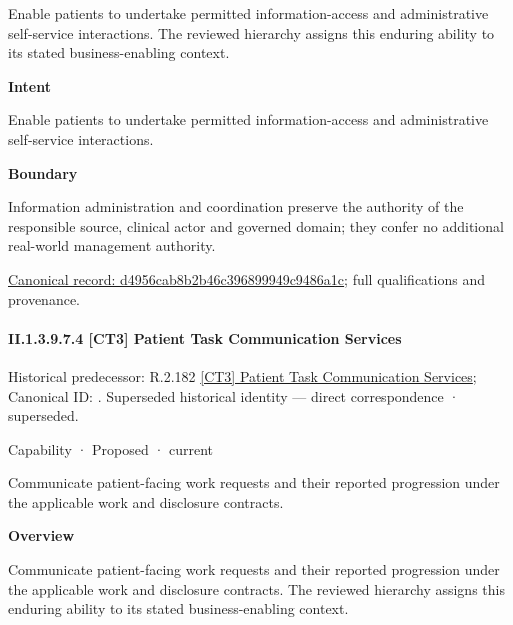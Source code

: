 Enable patients to undertake permitted information-access and administrative self-service interactions. The reviewed hierarchy assigns this enduring ability to its stated business-enabling context.



\textbf{Intent}



Enable patients to undertake permitted information-access and administrative self-service interactions.



\textbf{Boundary}



Information administration and coordination preserve the authority of the responsible source, clinical actor and governed domain; they confer no additional real-world management authority.


{\footnotesize \href{../../../../../../../continuum/strategy/capability/d4956cab8b2b46c396899949c9486a1c.md}{Canonical record: d4956cab8b2b46c396899949c9486a1c}; full qualifications and provenance.}\par
\paragraph*{II.1.3.9.7.4 [CT3] Patient Task Communication Services}
\label{navigation:II.1.3.9.7.4}

{\small Historical predecessor: R.2.182 \hyperref[element:0914f2bb267449e282e9ae0f7407d9fe]{[CT3] Patient Task Communication Services}; Canonical ID: \texttt{}. Superseded historical identity — direct correspondence · superseded.}\par
\label{element:ba8ce1d54ace4bc9aa3521dd954f36cb}
{\small Capability · Proposed · current}\par

Communicate patient-facing work requests and their reported progression under the applicable work and disclosure contracts.



\textbf{Overview}



Communicate patient-facing work requests and their reported progression under the applicable work and disclosure contracts. The reviewed hierarchy assigns this enduring ability to its stated business-enabling context.



